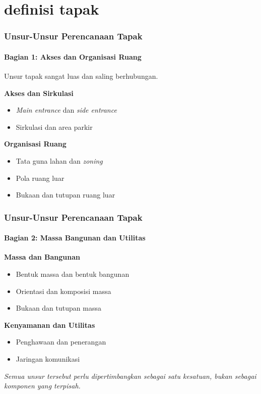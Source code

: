 \documentclass[../main.tex]{subfiles}
\begin{document}

\section{definisi tapak}%
\label{sec:definisi tapak}

\begin{frame}[mytitle=standard, t, mycolor=digiPH_gray, light]
	\frametitle{Unsur-Unsur Perencanaan Tapak}
	\framesubtitle{Bagian 1: Akses dan Organisasi Ruang}

	Unsur tapak sangat luas dan saling berhubungan.

	\vspace{0.3cm}
	\textbf{Akses dan Sirkulasi}
	\begin{itemize}
		\item \textit{Main entrance} dan \textit{side entrance}
		\item Sirkulasi dan area parkir
	\end{itemize}

	\vspace{0.3cm}
	\textbf{Organisasi Ruang}
	\begin{itemize}
		\item Tata guna lahan dan \textit{zoning}
		\item Pola ruang luar
		\item Bukaan dan tutupan ruang luar
	\end{itemize}
\end{frame}

\begin{frame}[mytitle=standard, t, mycolor=digiPH_cream, light]
	\frametitle{Unsur-Unsur Perencanaan Tapak}
	\framesubtitle{Bagian 2: Massa Bangunan dan Utilitas}

	\textbf{Massa dan Bangunan}
	\begin{itemize}
		\item Bentuk massa dan bentuk bangunan
		\item Orientasi dan komposisi massa
		\item Bukaan dan tutupan massa
	\end{itemize}

	\vspace{0.3cm}
	\textbf{Kenyamanan dan Utilitas}
	\begin{itemize}
		\item Penghawaan dan penerangan
		\item Jaringan komunikasi
	\end{itemize}

	\vspace{0.3cm}
	\textit{Semua unsur tersebut perlu dipertimbangkan sebagai satu kesatuan, bukan sebagai komponen yang terpisah.}
\end{frame}
\end{document}
